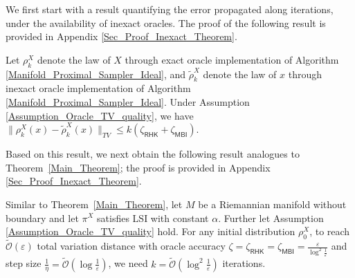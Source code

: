 We first start with a result quantifying the error propagated along iterations, under the availability of inexact oracles. The proof of the following result is provided in Appendix \ref{Sec_Proof_Inexact_Theorem}.
\begin{lemma}\label{Lemma_Propagation_Error_TV}
    Let $\rho_{k}^{X}$ denote the law of $X$ through exact oracle implementation of Algorithm \ref{Manifold_Proximal_Sampler_Ideal}, 
    and $\tilde{\rho}_{k}^{X}$ denote the law of $x$ through inexact oracle implementation of Algorithm \ref{Manifold_Proximal_Sampler_Ideal}.
    Under Assumption \ref{Assumption_Oracle_TV_quality}, we have $\|\rho_{k}^{X}(x) - \tilde{\rho}_{k}^{X}(x)\|_{TV} \le k (\zeta_{\mathsf{RHK}} + \zeta_{\mathsf{MBI}})$.
\end{lemma}
Based on this result, we next obtain the following result analogues to Theorem~\ref{Main_Theorem}; the proof is provided in Appendix \ref{Sec_Proof_Inexact_Theorem}.
\begin{theorem}\label{TV_Inexact_BM_Inexact_RHK}
  Similar to Theorem~\ref{Main_Theorem}, let $M$ be a Riemannian manifold without boundary and let $\pi^{X}$ satisfies LSI with constant $\alpha$. Further let Assumption \ref{Assumption_Oracle_TV_quality} hold.
    For any initial distribution $\rho_{0}^{X}$, to reach $\tilde{\mathcal{O}}(\varepsilon)$ 
    total variation distance with oracle accuracy $\zeta = \zeta_{\mathsf{RHK}} = \zeta_{\mathsf{MBI}} = \frac{\varepsilon}{\log^{2} \frac{1}{\varepsilon}}$
    and step size $\frac{1}{\eta} = \tilde{\mathcal{O}}(\log \frac{1}{\varepsilon})$, 
    we need $k = \tilde{\mathcal{O}}(\log^{2} \frac{1}{\varepsilon})$ iterations.
\end{theorem}

